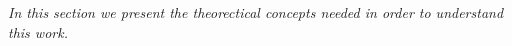 
\label{cap:chapter2}

\textit{In this section we present the theorectical concepts needed in order to understand this work.}




%
%
\cleardoublepage
